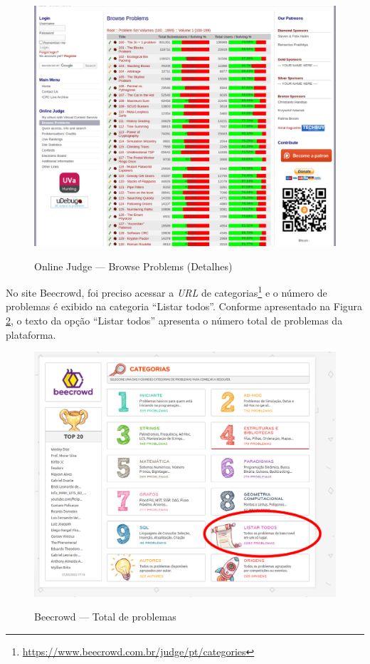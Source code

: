 \begin{figure}[H]
    \centering
    \caption{Online Judge — Browse Problems (Detalhes)}
    \includegraphics[keepaspectratio=true,scale=0.32]{figuras/online_judge_2.eps}
    \label{fig:online_judge_2}
\end{figure}

No site Beecrowd, foi preciso acessar a \textit{URL} de categorias\footnote{\url{https://www.beecrowd.com.br/judge/pt/categories}} e o número de problemas é exibido na categoria ``Listar todos''. Conforme apresentado na Figura \ref{fig:beecrowd_1}, o texto da opção ``Listar todos'' apresenta o número total de problemas da plataforma.

\begin{figure}[H]
    \centering
    \caption{Beecrowd — Total de problemas}
    \includegraphics[keepaspectratio=true,scale=0.4]{figuras/beecrowd_1.eps}
    \label{fig:beecrowd_1}
\end{figure}

